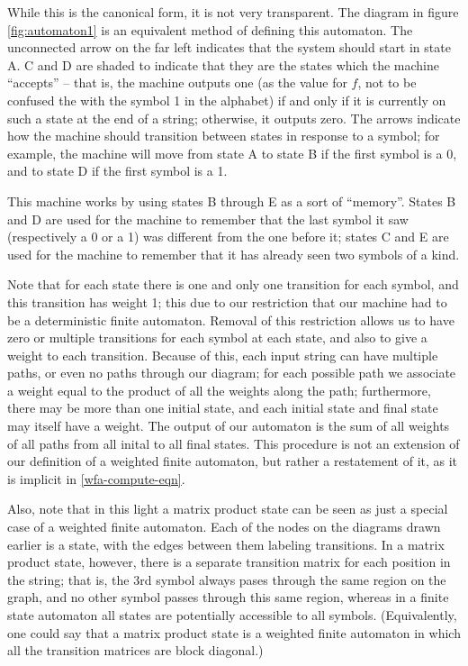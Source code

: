 \documentclass[12pt]{amsbook}
\theoremstyle{plain}
\theoremstyle{definition}
\theoremstyle{remark}
\begin{document}
While this is the canonical form, it is not very transparent.  The diagram in figure \ref{fig:automaton1} is an equivalent method of defining this automaton.  The unconnected arrow on the far left indicates that the system should start in state A.  C and D are shaded to indicate that they are the states which the machine ``accepts'' -- that is, the machine outputs one (as the value for $f$, not to be confused the with the symbol 1 in the alphabet) if and only if it is currently on such a state at the end of a string;  otherwise, it outputs zero.  The arrows indicate how the machine should transition between states in response to a symbol;  for example, the machine will move from state A to state B if the first symbol is a 0, and to state D if the first symbol is a 1.

This machine works by using states B through E as a sort of ``memory''.  States B and D are used for the machine to remember that the last symbol it saw (respectively a 0 or a 1) was different from the one before it;  states C and E are used for the machine to remember that it has already seen two symbols of a kind.

Note that for each state there is one and only one transition for each symbol, and this transition has weight 1;  this due to our restriction that our machine had to be a deterministic finite automaton.  Removal of this restriction allows us to have zero or multiple transitions for each symbol at each state, and also to give a weight to each transition.  Because of this, each input string can have multiple paths, or even no paths through our diagram;  for each possible path we associate a weight equal to the product of all the weights along the path;  furthermore, there may be more than one initial state, and each initial state and final state may itself have a weight.  The output of our automaton is the sum of all weights of all paths from all inital to all final states.  This procedure is not an extension of our definition of a weighted finite automaton, but rather a restatement of it, as it is implicit in \eqref{wfa-compute-eqn}.

Also, note that in this light a matrix product state can be seen as just a special case of a weighted finite automaton.  Each of the nodes on the diagrams drawn earlier is a state, with the edges between them labeling transitions.  In a matrix product state, however, there is a separate transition matrix for each position in the string; that is, the 3rd symbol always pases through the same region on the graph, and no other symbol passes through this same region, whereas in a finite state automaton all states are potentially accessible to all symbols.  (Equivalently, one could say that a matrix product state is a weighted finite automaton in which all the transition matrices are block diagonal.)
\end{document}
